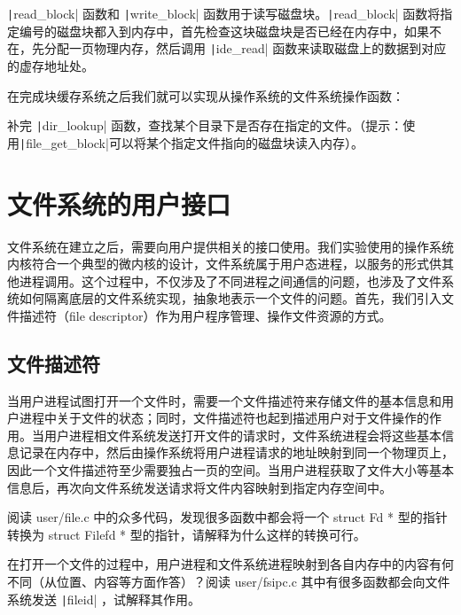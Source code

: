 \texttt|read_block| 函数和 \texttt|write_block| 函数用于读写磁盘块。\texttt|read_block|
函数将指定编号的磁盘块都入到内存中，首先检查这块磁盘块是否已经在内存中，如果不在，先分配一页物理内存，然后调用
\texttt|ide_read| 函数来读取磁盘上的数据到对应的虚存地址处。

在完成块缓存系统之后我们就可以实现从操作系统的文件系统操作函数：

\begin{exercise}
补完 \texttt|dir_lookup| 函数，查找某个目录下是否存在指定的文件。（提示：使用\texttt|file_get_block|可以将某个指定文件指向的磁盘块读入内存）。
\end{exercise}

\section{文件系统的用户接口}

文件系统在建立之后，需要向用户提供相关的接口使用。我们实验使用的操作系统内核符合一个典型的微内核的设计，文件系统属于用户态进程，以服务的形式供其他进程调用。这个过程中，不仅涉及了不同进程之间通信的问题，也涉及了文件系统如何隔离底层的文件系统实现，抽象地表示一个文件的问题。首先，我们引入文件描述符（file descriptor）作为用户程序管理、操作文件资源的方式。

\subsection{文件描述符}

当用户进程试图打开一个文件时，需要一个文件描述符来存储文件的基本信息和用户进程中关于文件的状态；同时，文件描述符也起到描述用户对于文件操作的作用。当用户进程相文件系统发送打开文件的请求时，文件系统进程会将这些基本信息记录在内存中，然后由操作系统将用户进程请求的地址映射到同一个物理页上，因此一个文件描述符至少需要独占一页的空间。当用户进程获取了文件大小等基本信息后，再次向文件系统发送请求将文件内容映射到指定内存空间中。

\begin{thinking}\label{think-Filefd-Fd}
阅读 user/file.c 中的众多代码，发现很多函数中都会将一个 struct Fd * 型的指针转换为 struct Filefd * 型的指针，请解释为什么这样的转换可行。
\end{thinking}

\begin{thinking}\label{think-fileid}
在打开一个文件的过程中，用户进程和文件系统进程映射到各自内存中的内容有何不同（从位置、内容等方面作答）？阅读 user/fsipc.c 其中有很多函数都会向文件系统发送 \texttt|fileid| ，试解释其作用。
\end{thinking}


